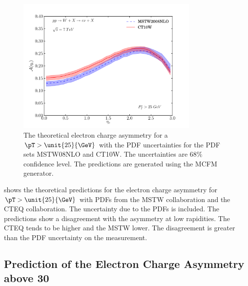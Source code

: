 \begin{figure}[htbp]
  \centering
  \includegraphics[width=0.8\textwidth]{asym-uncert}
  \caption[The theoretical electron charge asymmetry for a $\pT>\unit{25}{\GeV}$
with the {PDF} uncertainties.] {The theoretical electron charge
asymmetry\cite{monchenault2011predictions} for a $\pT>\unit{25}{\GeV}$ with the
{PDF} uncertainties for the {PDF} sets MSTW08NLO\cite{martin2009parton} and
CT10W\cite{lai2010vv}. The uncertainties are $68\%$ confidence level. The
predictions are generated using the {MCFM} \cite{campbellmcfm} generator.}
  \label{fig:asym-uncert}
\end{figure}

 shows the theoretical predictions for the electron charge asymmetry 
for $\pT>\unit{25}{\GeV}$ with PDFs
from the MSTW collaboration\cite{martin2009parton} and the CTEQ collaboration\cite{lai2010vv}.
The uncertainty due to the PDFs is included.
The predictions show a disagreement with the asymmetry at low rapidities. The
CTEQ tends to be higher and the MSTW lower. The disagreement is greater than the
PDF uncertainty on the measurement.

\subsection{Prediction of the Electron Charge Asymmetry above \unit{30}{\GeV}}

